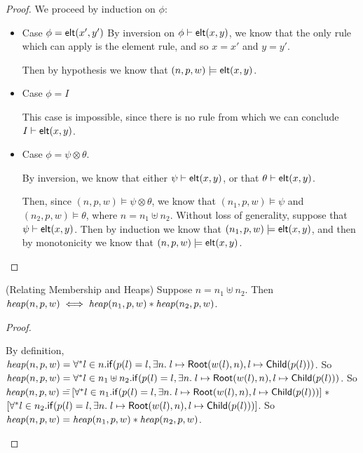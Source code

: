 \begin{proof}
We proceed by induction on $\phi$: 
\begin{itemize}
  \item Case $\phi = \mathsf{elt}({x'}, {y'})$
    By inversion on ${\phi} \vdash \mathsf{elt}({x}, {y})$, we know that the only 
    rule which can apply is the element rule, and so $x = x'$ and $y = y'$. 

    Then by hypothesis we know that $(n, p, w) \models \mathsf{elt}({x}, {y})$. 

  \item Case $\phi = I$

    This case is impossible, since there is no rule from which we can
    conclude ${I} \vdash \mathsf{elt}({x}, {y})$. 

  \item Case $\phi = \psi \otimes \theta$. 

    By inversion, we know that either ${\psi} \vdash \mathsf{elt}({x}, {y})$, or 
    that ${\theta} \vdash \mathsf{elt}({x}, {y})$. 

    Then, since $(n, p, w) \models \psi \otimes \theta$, we know 
    that $(n_1, p, w) \models \psi$ and $(n_2, p, w) \models \theta$,
    where $n = n_1 \uplus n_2$. Without loss of generality, 
    suppose that ${\psi} \vdash \mathsf{elt}({x}, {y})$. Then by induction we know
    that $(n_1, p, w) \models \mathsf{elt}({x}, {y})$, and then by monotonicity 
    we know that $(n, p, w) \models \mathsf{elt}({x}, {y})$. 
\end{itemize}
\end{proof}

\begin{lemma}{(Relating Membership and Heaps)}
Suppose $n = n_1 \uplus n_2$. Then $\mathit{heap}(n, p, w) \iff \mathit{heap}(n_1, p, w) * \mathit{heap}(n_2, p, w)$. 
\end{lemma}

\begin{proof}
  \begin{specification}
    \nextline By definition, $\mathit{heap}(n, p, w) =  \forall^{*} l \in n. \mathsf{if}({p(l) = l}, {\exists n.\; l \mapsto \mathsf{Root}(w(l), n)}, {l \mapsto \mathsf{Child}(p(l))})$.
    \nextline So $\mathit{heap}(n, p, w) =  \forall^{*} l \in n_1 \uplus n_2. \mathsf{if}({p(l) = l}, {\exists n.\; l \mapsto \mathsf{Root}(w(l), n)}, {l \mapsto \mathsf{Child}(p(l))})$.
    \nextline So $\mathit{heap}(n, p, w) =  $\=$[\forall^{*} l \in n_1. \mathsf{if}({p(l) = l}, {\exists n.\; l \mapsto \mathsf{Root}(w(l), n)}, {l \mapsto \mathsf{Child}(p(l))})] \;*$ 
    \nextline \> $[\forall^{*} l \in n_2. \mathsf{if}({p(l) = l}, {\exists n.\; l \mapsto \mathsf{Root}(w(l), n)}, {l \mapsto \mathsf{Child}(p(l))})]$.
    \nextline So $\mathit{heap}(n, p, w) = \mathit{heap}(n_1, p, w) * \mathit{heap}(n_2, p, w)$. 
  \end{specification}
\end{proof}

